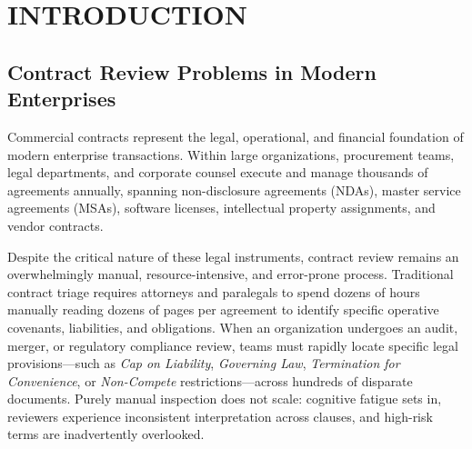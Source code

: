 \chapter{INTRODUCTION}
\label{ch:introduction}

\section*{Contract Review Problems in Modern Enterprises}
\label{sec:contract_problems}
Commercial contracts represent the legal, operational, and financial foundation of modern enterprise transactions. Within large organizations, procurement teams, legal departments, and corporate counsel execute and manage thousands of agreements annually, spanning non-disclosure agreements (NDAs), master service agreements (MSAs), software licenses, intellectual property assignments, and vendor contracts. 

Despite the critical nature of these legal instruments, contract review remains an overwhelmingly manual, resource-intensive, and error-prone process. Traditional contract triage requires attorneys and paralegals to spend dozens of hours manually reading dozens of pages per agreement to identify specific operative covenants, liabilities, and obligations. When an organization undergoes an audit, merger, or regulatory compliance review, teams must rapidly locate specific legal provisions—such as \textit{Cap on Liability}, \textit{Governing Law}, \textit{Termination for Convenience}, or \textit{Non-Compete} restrictions—across hundreds of disparate documents. Purely manual inspection does not scale: cognitive fatigue sets in, reviewers experience inconsistent interpretation across clauses, and high-risk terms are inadvertently overlooked.

